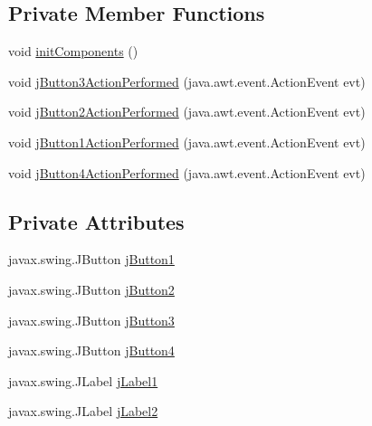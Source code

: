 \subsection*{Private Member Functions}
\begin{DoxyCompactItemize}
\item 
void \mbox{\hyperlink{class_interfaz_package_1_1_interfaz_cliente_ae58f2a5fe5f253614b532402d9d86dfe}{init\+Components}} ()
\item 
void \mbox{\hyperlink{class_interfaz_package_1_1_interfaz_cliente_a49bdd2ccad1a21cac6b70a069e440a69}{j\+Button3\+Action\+Performed}} (java.\+awt.\+event.\+Action\+Event evt)
\item 
void \mbox{\hyperlink{class_interfaz_package_1_1_interfaz_cliente_a07223b4b24e57be25514ed5d515a3fae}{j\+Button2\+Action\+Performed}} (java.\+awt.\+event.\+Action\+Event evt)
\item 
void \mbox{\hyperlink{class_interfaz_package_1_1_interfaz_cliente_a0734280a4dc2dfc6f1c2a629118d07dd}{j\+Button1\+Action\+Performed}} (java.\+awt.\+event.\+Action\+Event evt)
\item 
void \mbox{\hyperlink{class_interfaz_package_1_1_interfaz_cliente_a2d52e60b1ae90075685a12355727cefd}{j\+Button4\+Action\+Performed}} (java.\+awt.\+event.\+Action\+Event evt)
\end{DoxyCompactItemize}
\subsection*{Private Attributes}
\begin{DoxyCompactItemize}
\item 
javax.\+swing.\+J\+Button \mbox{\hyperlink{class_interfaz_package_1_1_interfaz_cliente_a3734b48adc59c34c0adb8eb82178f408}{j\+Button1}}
\item 
javax.\+swing.\+J\+Button \mbox{\hyperlink{class_interfaz_package_1_1_interfaz_cliente_a0196e2e1cfcbbbc8861c08f6a0a37ae4}{j\+Button2}}
\item 
javax.\+swing.\+J\+Button \mbox{\hyperlink{class_interfaz_package_1_1_interfaz_cliente_a25b735a55e8862dffce033dda1112430}{j\+Button3}}
\item 
javax.\+swing.\+J\+Button \mbox{\hyperlink{class_interfaz_package_1_1_interfaz_cliente_a724801e1312c508ba148b8928739811e}{j\+Button4}}
\item 
javax.\+swing.\+J\+Label \mbox{\hyperlink{class_interfaz_package_1_1_interfaz_cliente_a566a82ef3d269cafc1ea835fddd6a92a}{j\+Label1}}
\item 
javax.\+swing.\+J\+Label \mbox{\hyperlink{class_interfaz_package_1_1_interfaz_cliente_adddf6bbdd3ebab836af4f159294fd8ff}{j\+Label2}}
\end{DoxyCompactItemize}


